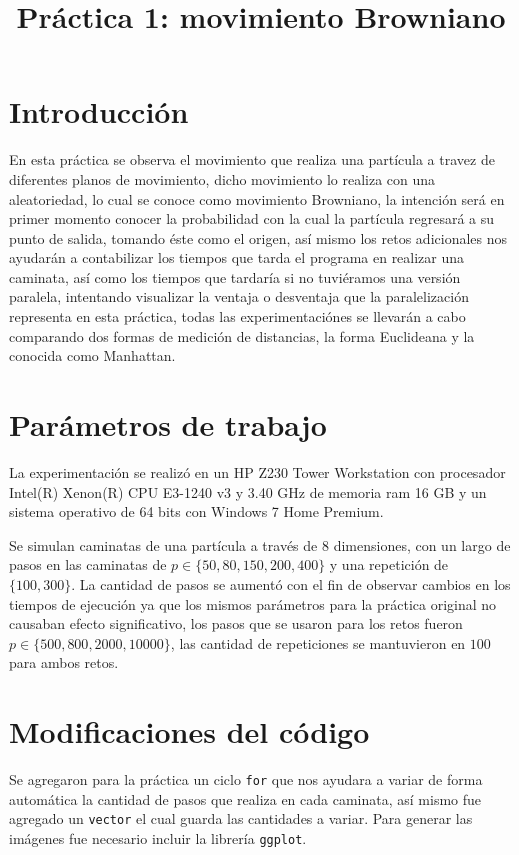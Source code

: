 \documentclass[a4paper]{article}
\title{Práctica 1: movimiento Browniano}
\date{}
\begin{document}
\maketitle

\section{Introducci\'on}
En esta práctica se observa el movimiento que realiza una partícula a travez de diferentes planos de movimiento, dicho movimiento lo realiza con una aleatoriedad, lo cual se conoce como movimiento Browniano, la intención será en primer momento conocer la probabilidad con la cual la partícula regresará a su punto de salida, tomando éste como el origen, así mismo los retos adicionales nos ayudarán a contabilizar los tiempos que tarda el programa en realizar una caminata, así como los tiempos que tardaría si no tuviéramos una versión paralela, intentando visualizar la ventaja o desventaja que la paralelización representa en esta práctica, todas las experimentaciónes se llevarán a cabo comparando dos formas de medición de distancias, la forma Euclideana y la conocida como Manhattan.
\section{Par\'ametros de trabajo}
La experimentación se realizó en un HP Z230 Tower Workstation con procesador Intel(R) Xenon(R) CPU E3-1240 v3 y 3.40 GHz de memoria ram 16 GB y un sistema operativo de 64 bits con Windows 7 Home Premium.

Se simulan caminatas de una partícula a través de $8$ dimensiones, con un largo de pasos en las caminatas de $p \in \{50,80,150,200,400\}$ y una repetición de $\{100, 300\}$. La cantidad de pasos se aumentó con el fin de observar cambios en los tiempos de ejecución ya que los mismos parámetros para la práctica original no causaban efecto significativo, los pasos que se usaron para los retos fueron $p \in \{500,800,2000,10000\}$, las cantidad de repeticiones se mantuvieron en $100$ para ambos retos.

\section{Modificaciones del código}
Se agregaron para la práctica un ciclo \texttt{for} que nos ayudara a variar de forma automática la cantidad de pasos que realiza en cada caminata, así mismo fue agregado un \texttt{vector} el cual guarda las cantidades a variar. Para generar las imágenes fue necesario incluir la librería \texttt{ggplot}.
\end{document}
